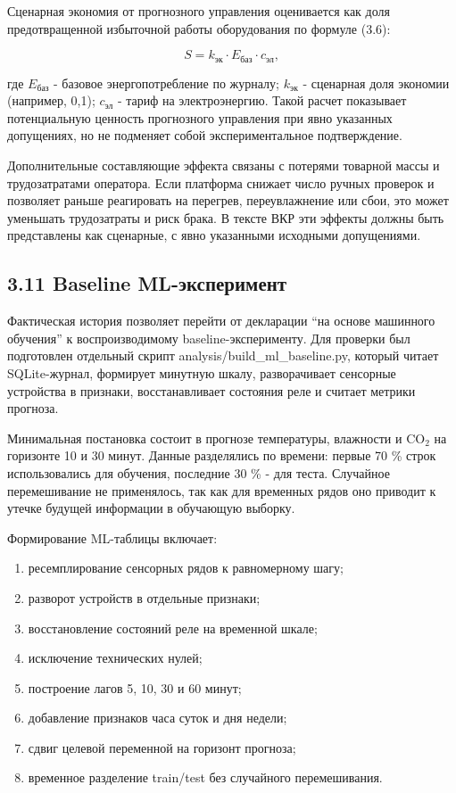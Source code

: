 \documentclass[a4paper,14pt]{extarticle}
\renewcommand{\texttt}[1]{\textnormal{#1}}
\providecommand{\tightlist}{%
  \setlength{\itemsep}{0pt}\setlength{\parskip}{0pt}}
\begin{document}
Сценарная экономия от прогнозного управления оценивается как доля
предотвращенной избыточной работы оборудования по формуле (3.6):

\begin{equation}
S = k_{\text{эк}} \cdot E_{\text{баз}} \cdot c_{\text{эл}},
\tag{3.6}
\end{equation}

где \(E_{\text{баз}}\) - базовое энергопотребление по журналу;
\(k_{\text{эк}}\) - сценарная доля экономии (например, 0,1);
\(c_{\text{эл}}\) - тариф на электроэнергию. Такой расчет показывает
потенциальную ценность прогнозного управления при явно указанных
допущениях, но не подменяет собой экспериментальное подтверждение.

Дополнительные составляющие эффекта связаны с потерями товарной массы и
трудозатратами оператора. Если платформа снижает число ручных проверок и
позволяет раньше реагировать на перегрев, переувлажнение или сбои, это
может уменьшать трудозатраты и риск брака. В тексте ВКР эти эффекты
должны быть представлены как сценарные, с явно указанными исходными
допущениями.

\hypertarget{baseline-ml-ux44dux43aux441ux43fux435ux440ux438ux43cux435ux43dux442}{%
\subsection{3.11 Baseline
ML-эксперимент}\label{baseline-ml-ux44dux43aux441ux43fux435ux440ux438ux43cux435ux43dux442}}

Фактическая история позволяет перейти от декларации ``на основе
машинного обучения'' к воспроизводимому baseline-эксперименту. Для
проверки был подготовлен отдельный скрипт
\texttt{analysis/build\_ml\_baseline.py}, который читает SQLite-журнал,
формирует минутную шкалу, разворачивает сенсорные устройства в признаки,
восстанавливает состояния реле и считает метрики прогноза.

Минимальная постановка состоит в прогнозе температуры, влажности и
CO\(_2\) на горизонте 10 и 30 минут. Данные разделялись по времени:
первые 70 \% строк использовались для обучения, последние 30 \% - для
теста. Случайное перемешивание не применялось, так как для временных
рядов оно приводит к утечке будущей информации в обучающую выборку.

Формирование ML-таблицы включает:

\begin{enumerate}
\def\labelenumi{\arabic{enumi})}
\tightlist
\item
  ресемплирование сенсорных рядов к равномерному шагу;
\item
  разворот устройств в отдельные признаки;
\item
  восстановление состояний реле на временной шкале;
\item
  исключение технических нулей;
\item
  построение лагов 5, 10, 30 и 60 минут;
\item
  добавление признаков часа суток и дня недели;
\item
  сдвиг целевой переменной на горизонт прогноза;
\item
  временное разделение train/test без случайного перемешивания.
\end{enumerate}
\end{document}
